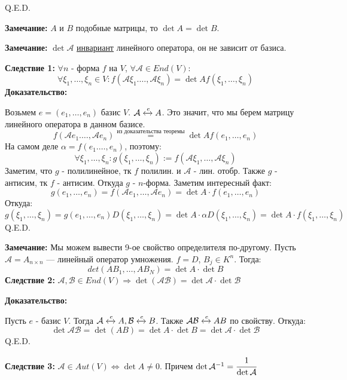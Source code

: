 \hfill Q.E.D.

\textbf{Замечание:} $A$ и $B$ подобные матрицы, то $\det A = \det B$.

\textbf{Замечание:} $\det \mathcal{A}$ \uline{инвариант} линейного оператора, он не зависит от базиса.

\textbf{Следствие 1:} $\forall n$ - форма $f$ на $V$, $\forall \mathcal{A} \in End(V)$:
$$\forall \xi_1,\ldots, \xi_n \in V: f(\mathcal{A}\xi_1.\ldots, \mathcal{A}\xi_n) =\det A f(\xi_1,\ldots, \xi_n)$$
\textbf{Доказательство:}

Возьмем $e = (e_1,\ldots,e_n)$ базис $V$. $\mathcal{A} \xleftrightarrow{e}A$. Это значит, что мы берем матрицу линейного оператора в данном базисе.
$$f(\mathcal{A}e_1.\ldots, \mathcal{A}e_n) \overset{\text{из доказательства теоремы}}{=}\det Af(e_1,\ldots,e_n)$$
На самом деле $\alpha = f(e_1.\ldots,e_n)$, поэтому:
$$\forall \xi_1,\ldots,\xi_n : g(\xi_1,\ldots,\xi_n):= f(\mathcal{A}\xi_1,\ldots, \mathcal{A} \xi_n)$$
Заметим, что $g$ - полилинейное, тк $f$ полилин. и $\mathcal{A}$ - лин. отобр. Также $g$ - антисим, тк $f$ - антисим. Откуда $g$ - $n$-форма. Заметим интересный факт:
$$g(e_1,\ldots,e_n) = f(\mathcal{A}e_1,\ldots,\mathcal{A}e_n) = \det A \cdot f(e_1,\ldots,e_n)$$
Откуда:
$$ g(\xi_1,\ldots,\xi_n)= g(e_1,\ldots,e_n) D(\xi_1,\ldots,\xi_n) = \det A  \cdot \alpha D(\xi_1,\ldots,\xi_n) = \det A \cdot f(\xi_1,\ldots,\xi_n)$$
\hfill Q.E.D.

\textbf{Замечание:} Мы можем вывести 9-ое свойство определителя по-другому. Пусть $\mathcal{A} = A_{n\times n}$ --- линейный оператор умножения.
$f = D$, $B_j \in K^n$. Тогда:
$$det(AB_1,\ldots, AB_N) = \det A \cdot \det B $$
\textbf{Следствие 2:}
$\mathcal{A},\mathcal{B} \in End(V) \Rightarrow \det(\mathcal{A} \mathcal{B}) = \det \mathcal{A} \cdot \det \mathcal{B}$

\textbf{Доказательство:}

Пусть $e$ - базис $V$. Тогда $\mathcal{A} \xleftrightarrow{e}A, \mathcal{B}\xleftrightarrow{e}B$. Также $\mathcal{A}\mathcal{B} \xleftrightarrow{e}AB$ по свойству. Откуда:
$$\det \mathcal{A}\mathcal{B} = \det(AB) = \det A \cdot \det B = \det \mathcal{A} \cdot \det\mathcal{B}$$
\hfill Q.E.D.

\textbf{Следствие 3:} $\mathcal{A} \in Aut(V) \Leftrightarrow \det A \neq 0$. Причем $\det \mathcal{A}^{-1} = \cfrac{1}{\det \mathcal{A}}$

